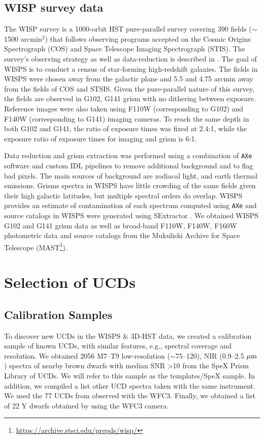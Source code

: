 \documentclass[manuscript]{aastex63}
\begin{document}
\subsection{WISP survey data}
The WISP survey is a 1000-orbit HST pure-parallel survey covering 390 fields ($\sim$1500 arcmin$^2$) that follows observing programs accepted on the Cosmic Origins Spectrograph (COS) and Space Telescope Imaging Spectrograph (STIS). The survey's observing strategy as well as data-reduction is described in \cite{2010ApJ...723..104A}. The goal of WISPS is to conduct a census of star-forming high-redshift galaxies. The fields in WISPS were chosen away from the galactic plane and  5.5 and 4.75 arcmin away from the fields of COS and STSIS. Given the pure-parallel nature of this survey, the fields are observed in G102, G141 grism with no dithering between exposure. Reference images were also taken using F110W (corresponding to G102) and F140W (corresponding to G141) imaging cameras. To reach the same depth in both G102 and G141, the ratio of exposure times was fixed at 2.4:1, while the exposure ratio of exposure times for imaging and grism is 6:1.

Data reduction and grism extraction was performed using a combination of \texttt{AXe} software \citep{Kuntschner2013, Kummel2009} and custom IDL pipelines to remove additional background and to flag bad pixels. The main sources of background are zodiacal light, and earth thermal emissions. Grisms spectra in WISPS have little crowding of the same fields given their high galactic latitudes, but multiple spectral orders do overlap. WISPS provides an estimate of contamination of each spectrum computed using \texttt{AXe} and source catalogs in WISPS were generated using SExtractor \citep{1996A&AS..117..393B}. We obtained WISPS G102 and G141 grism data as well as broad-band F110W, F140W, F160W photometric data and source catalogs from the Mukuliski Archive for Space Telescope (MAST\footnote{\url{https://archive.stsci.edu/prepds/wisp/}}). 


\section{Selection of UCDs}\label{sec:selectionp}

\subsection{Calibration Samples}\label{sec:trainset}
To discover new UCDs in the WISPS \& 3D-HST data, we created a calibration sample of known UCDs, with similar features, e.g., spectral coverage and resolution. We obtained 2056 M7--T9 low-resolution ($\sim$75--120), NIR (0.9--2.5 $\mbox{$\mu$m}$) spectra of nearby brown dwarfs with median SNR \textgreater 10 from the SpeX Prism Library \citep[SPL\footnote{\url{https://cass.ucsd.edu/~ajb/browndwarfs/spexprism/library.html}};][]{2014arXiv1406.4887B} of UCDs. We will refer to this sample as the templates/SpeX sample. In addition, we compiled a list other UCD spectra taken with the same instrument. We used the 77 UCDs from \cite{Manjavacas2018} observed with the WFC3. Finally, we obtained a list of 22 Y dwarfs obtained by \cite{Schneider2015} using the WFC3 camera. 
\end{document}
